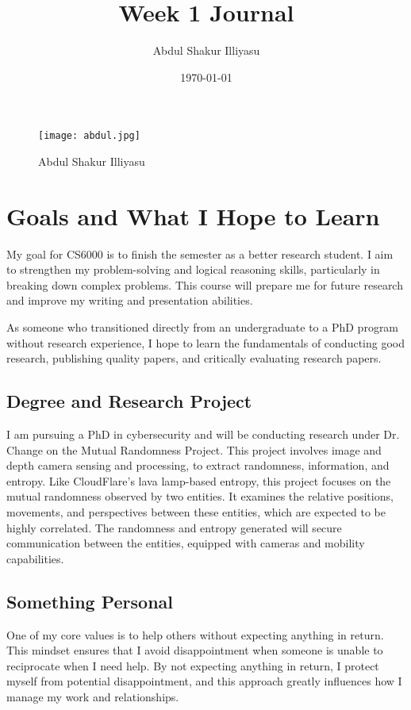 \documentclass{article}
\title{Week 1 Journal}
\author{Abdul Shakur Illiyasu}
\date{\today}
\begin{document}
\maketitle

\begin{figure}[ht]
    \centering
    \texttt{[image: abdul.jpg]}
    \caption{Abdul Shakur Illiyasu}
    \label{fig: picture.jpg}
\end{figure}

\section{Goals and What I Hope to Learn}

My goal for CS6000 is to finish the semester as a better research student. I aim to strengthen my problem-solving and logical reasoning skills, particularly in breaking down complex problems. This course will prepare me for future research and improve my writing and presentation abilities.

As someone who transitioned directly from an undergraduate to a PhD program without research experience, I hope to learn the fundamentals of conducting good research, publishing quality papers, and critically evaluating research papers.

\subsection{Degree and Research Project}
I am pursuing a PhD in cybersecurity and will be conducting research under Dr. Change on the Mutual Randomness Project. This project involves image and depth camera sensing and processing, to extract randomness, information, and entropy. Like CloudFlare’s lava lamp-based entropy, this project focuses on the mutual randomness observed by two entities. It examines the relative positions, movements, and perspectives between these entities, which are expected to be highly correlated. The randomness and entropy generated will secure communication between the entities, equipped with cameras and mobility capabilities.

\subsection {Something Personal}
One of my core values is to help others without expecting anything in return. This mindset ensures that I avoid disappointment when someone is unable to reciprocate when I need help. By not expecting anything in return, I protect myself from potential disappointment, and this approach greatly influences how I manage my work and relationships.
\end{document}
